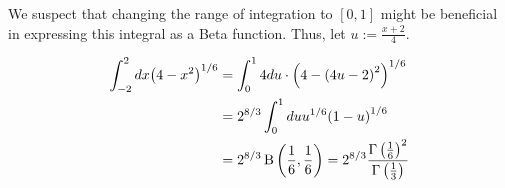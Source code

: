 \item

We suspect that changing the range of integration to $[0, 1]$ might be beneficial
in expressing this integral as a Beta function.
Thus, let $u := \frac{x + 2}{4}$.

\begin{align*}
    \int_{-2}^2 dx {\left( 4 - x^2 \right)}^{1/6}
    &= \int_0^1 4du \cdot {\left( 4 - {\left( 4u - 2 \right)}^2 \right)}^{1/6} \\
    &= 2^{8/3} \int_0^1 du u^{1/6} {(1 - u)}^{1/6} \\
    &= 2^{8/3} \operatorname{B}\left( \frac{1}{6}, \frac{1}{6} \right)
     = 2^{8/3} \frac{{\Gamma\left( \frac{1}{6} \right)}^2}{\Gamma\left( \frac{1}{3} \right)}
\end{align*}